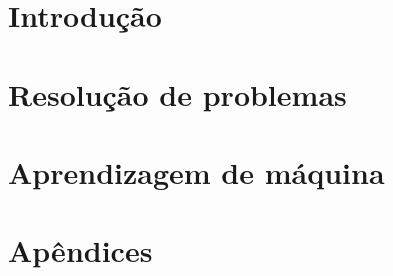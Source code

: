 \newcommand{\defs}{../defs}


\newcommand{\myname}{Prof. Marcelo de Souza}
\newcommand{\university}{Universidade do Estado de Santa Catarina}
\newcommand{\campus}{Centro de Educação Superior do Alto Vale do Itajaí}
\newcommand{\mytitle}{Inteligência Computacional\\Notas de Aula}
\newcommand{\version}{Versão compilada em \today.}
\newcommand{\exercisedescription}{Exercício}

\newcommand{\presentation}{Este material é utilizado nas aulas da disciplina de Inteligência Computacional (75INC) do curso de Bacharelado em Engenharia de Software da Universidade do Estado de Santa Catarina (UDESC Ibirama). Cada capítulo apresenta no seu cabeçalho uma ou mais leituras obrigatórias, que consistem nos materiais que serviram de base para o desenvolvimento do capítulo. \\ \\
\textbf{Contato:} \texttt{marcelo.desouza@udesc.br}}

\newcommand{\license}{\small Esta obra está disponível sob uma Licença \href{https://creativecommons.org/licenses/by-nc-nd/4.0}{Creative Commons (BY-NC-ND 4.0 Internacional)}.}

\newcommand{\logo}{
\begin{figure}[h]
	\centering
	\texttt{[image: \\defs/img/logo-udesc.png]}
\end{figure}
}



\maketitle
\tableofcontents

\part{Introdução}



\part{Resolução de problemas}


 
\part{Aprendizagem de máquina}





\part{Apêndices}
\appendix


\nocite{*}



